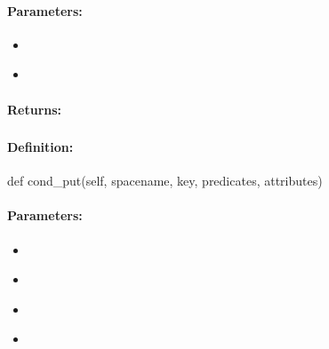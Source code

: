 \paragraph{Parameters:}
\begin{itemize}[noitemsep]
\item {}\\

\item {}\\

\end{itemize}

\paragraph{Returns:}


\pagebreak
\subsubsection{}
\label{api:python:cond_put}


\paragraph{Definition:}
\begin{pythoncode}
def cond_put(self, spacename, key, predicates, attributes)
\end{pythoncode}

\paragraph{Parameters:}
\begin{itemize}[noitemsep]
\item {}\\

\item {}\\

\item {}\\

\item {}\\

\end{itemize}

